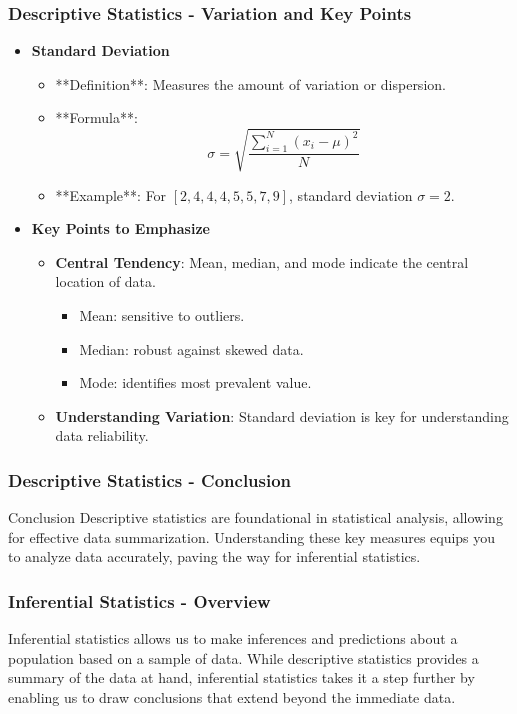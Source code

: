 \documentclass{beamer}
\begin{document}
\begin{frame}[fragile]
    \frametitle{Descriptive Statistics - Variation and Key Points}
    \begin{itemize}
        \item \textbf{Standard Deviation}
            \begin{itemize}
                \item **Definition**: Measures the amount of variation or dispersion.
                \item **Formula**: 
                \[
                \sigma = \sqrt{\frac{\sum_{i=1}^{N}(x_i - \mu)^2}{N}}
                \]
                \item **Example**: For \( [2, 4, 4, 4, 5, 5, 7, 9] \), standard deviation \( \sigma = 2 \).
            \end{itemize}
        \item \textbf{Key Points to Emphasize}
            \begin{itemize}
                \item \textbf{Central Tendency}: Mean, median, and mode indicate the central location of data. 
                    \begin{itemize}
                        \item Mean: sensitive to outliers.
                        \item Median: robust against skewed data.
                        \item Mode: identifies most prevalent value.
                    \end{itemize}
                \item \textbf{Understanding Variation}: Standard deviation is key for understanding data reliability.
            \end{itemize}
    \end{itemize}
\end{frame}

\begin{frame}[fragile]
    \frametitle{Descriptive Statistics - Conclusion}
    \begin{block}{Conclusion}
        Descriptive statistics are foundational in statistical analysis, allowing for effective data summarization. Understanding these key measures equips you to analyze data accurately, paving the way for inferential statistics.
    \end{block}
\end{frame}

\begin{frame}[fragile]
    \frametitle{Inferential Statistics - Overview}
    Inferential statistics allows us to make inferences and predictions about a population based on a sample of data. 
    While descriptive statistics provides a summary of the data at hand, inferential statistics takes it a step further by enabling us to draw conclusions that extend beyond the immediate data.
\end{frame}
\end{document}
